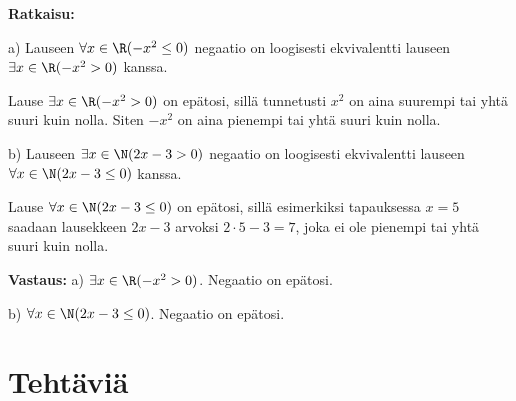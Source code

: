{\bf Ratkaisu:}

a) Lauseen $\forall x \in \R(-x^2 \le 0)$ negaatio on loogisesti ekvivalentti lauseen $\exists x\in \R (-x^2 > 0)$ kanssa.

Lause $\exists x\in \R (-x^2> 0)$ on epätosi, sillä tunnetusti $x^2$ on aina suurempi tai yhtä suuri kuin nolla. Siten $-x^2$ on aina pienempi tai yhtä suuri kuin nolla.

b) Lauseen $\exists x\in \N(2x-3>0)$ negaatio on loogisesti ekvivalentti lauseen $\forall x\in \N(2x-3 \le 0)$ kanssa.

Lause $\forall x\in \N(2x-3 \le 0)$ on epätosi, sillä esimerkiksi tapauksessa $x=5$ saadaan lausekkeen $2x - 3$ arvoksi $2\cdot 5 -3 = 7$, joka ei ole pienempi tai yhtä suuri kuin nolla.

{\bf Vastaus:} a) $\exists x\in \R (-x^2 > 0)$. Negaatio on epätosi. 

b) $\forall x\in \N(2x-3 \le 0)$. Negaatio on epätosi.



\newpage

\section*{Tehtäviä}

